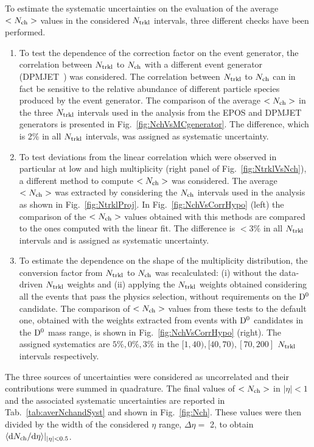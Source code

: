 To estimate the systematic uncertainties on the evaluation of the average 
$<N_{\rm ch}>$ values in the considered $N_{\rm trkl}$ intervals, three different checks have been performed.
\begin{enumerate}
\item To test the dependence of the correction factor on the event generator, the correlation between
$N_{\rm trkl}$ to $N_{\rm ch}$ with a different event generator (DPMJET~\cite{Ranft:1994fd}) was considered. The correlation
between $N_{\rm trkl}$ to $N_{\rm ch}$ can in fact be sensitive to the relative abundance of different particle species
produced by the event generator. The comparison of the average $<N_{\rm ch}>$ in the three $N_{\rm trkl}$ intervals
used in the analysis from the EPOS and DPMJET generators
is presented in Fig.~\ref{fig:NchVsMCgenerator}. The difference, which is 2\% in all $N_{\rm trkl}$ intervals,
was assigned as systematic uncertainty.
\item To test deviations from the linear correlation which were observed in particular at low and high multiplicity (right panel of Fig.~\ref{fig:NtrklVsNch}), a different method to compute $<N_{\rm ch}>$ was considered.  
The average $<N_{\rm ch}>$ was extracted by considering the $N_{\rm ch}$ intervals used in the analysis as shown in Fig.~\ref{fig:NtrklProj}.
In Fig.~\ref{fig:NchVsCorrHypo} (left) the comparison of the $<N_{\rm ch}>$ values
obtained with this methods are compared to the ones computed with the linear fit. The difference
is $<3\%$ in all $N_{\rm trkl}$ intervals and is assigned as systematic uncertainty.
\item To estimate the dependence on the shape of the multiplicity distribution,
the conversion factor from $N_{\rm trkl}$ to $N_{\rm ch}$ was recalculated: (i) without the data-driven 
$N_{\rm trkl}$ weights and (ii) applying the $N_{\rm trkl}$ weights obtained considering all 
the events that pass the physics selection, without requirements on the 
${\rm D^0}$ candidate. The comparison of $<N_{\rm ch}>$ values from these tests to the default one, 
obtained with the weights extracted from events with ${\rm D^0}$ candidates in the ${\rm D^0}$ mass range, 
is shown in Fig.~\ref{fig:NchVsCorrHypo} (right). The assigned systematics are $5\%, 0\%, 3\%$ in the 
$[1,40), [40,70), [70,200]$ $N_{\rm trkl}$ intervals respectively.
\end{enumerate}
The three sources of uncertainties were considered as 
uncorrelated and their contributions were summed in quadrature. The final values of $<N_{\rm ch}>$ in $|\eta|<1$ 
and the associated systematic uncertainties are reported in Tab.~\ref{tab:averNchandSyst} and shown in 
Fig.~\ref{fig:Nch}. These values were then divided by the 
width of the considered $\eta$ range, $\Delta \eta =$ 2, 
to obtain $\langle {\rm d} N_{\rm ch}/{\rm d}  \eta \rangle |_{|\eta|<0.5}$.\\



